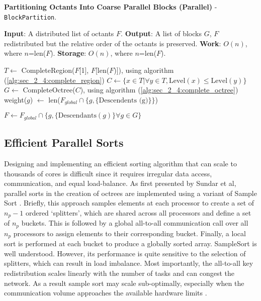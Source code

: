 \begin{algorithm}
    \caption{\textbf{Partitioning Octants Into Coarse Parallel Blocks (Parallel)} - \texttt{BlockPartition}.}
    \label{alg:sec_2_4:block_partition}
    \begin{algorithmic}
        \STATE \textbf{Input}: A distributed list of octants $F$.
        \STATE \textbf{Output}: A list of blocks $G$, $F$ redistributed but the relative order of the octants is preserved. 
        \STATE \textbf{Work}: $O(n)$, where $n$=len($F$).
        \STATE \textbf{Storage}: $O(n)$, where $n$=len($F$).

        \STATE $T \gets $ CompleteRegion($F$[1], $F$[len($F$)]), using algorithm (\ref{alg:sec_2_4:complete_region})
        \STATE $C \gets \{ x \in T | \forall y \in T, \text{Level}(x) \leq \text{Level}(y) \}$
        \STATE $G \gets $ CompleteOctree($C$), using algorithm (\ref{alg:sec_2_4:complete_octree})
            weight($g$) $\gets $ len($F_{global} \cap \{ g,  \{ \text{Descendents (g)} \} \}$)
        \ENDFOR

        \STATE $F \gets F_{global} \cap \{ g, \{ \text{Descendants}(g) \} \forall g \in G \}$
    \end{algorithmic}
\end{algorithm}


\subsection*{Efficient Parallel Sorts}

Designing and implementing an efficient sorting algorithm that can scale to thousands of cores is difficult since it requires irregular data access, communication, and equal load-balance. As first presented by Sundar et al, parallel sorts in the creation of octrees are implemented using a variant of Sample Sort \cite{sundar2008bottom}. Briefly, this approach samples elements at each processor to create a set of $n_p - 1 $ ordered `splitters', which are shared across all processors and define a set of $n_p$ buckets. This is followed by a global all-to-all communication call over all $n_p$ processors to assign elements to their corresponding bucket. Finally, a local sort is performed at each bucket to produce a globally sorted array. SampleSort is well understood. However, its performance is quite sensitive to the selection of splitters, which can result in load imbalance. Most importantly, the all-to-all key redistribution scales linearly with the number of tasks and can congest the network. As a result sample sort may scale sub-optimally, especially when the communication volume approaches the available hardware limits \cite{sundar2013hyksort}.

